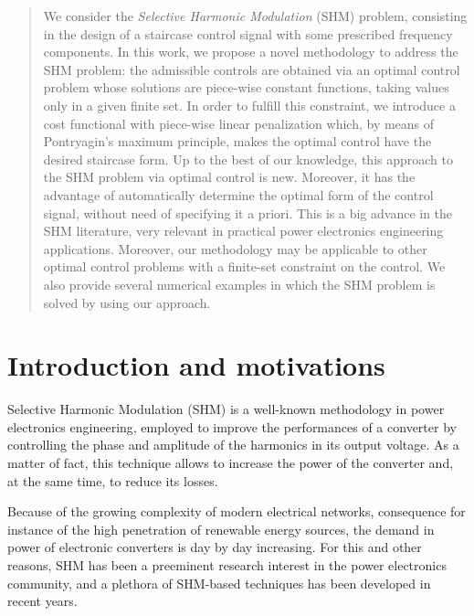 \documentclass[twocolumn]{autart}    %
\begin{document}
\begin{frontmatter}
\begin{abstract}%
We consider the \emph{Selective Harmonic Modulation} (SHM) problem, consisting in the design of a staircase control signal with some prescribed frequency components. In this work, we propose a novel methodology to  address the SHM problem: the admissible controls are obtained via an optimal control problem whose solutions are piece-wise constant functions, taking values only in a given finite set. In order to fulfill this constraint, we introduce a cost functional with piece-wise linear penalization which, by means of Pontryagin's maximum principle, makes the optimal control have the desired staircase form. Up to the best of our knowledge, this approach to the SHM problem via optimal control is new. Moreover, it has the  advantage of automatically determine the optimal form of the control signal, without need of specifying it a priori. This is a big advance in the SHM literature, very relevant in practical power electronics engineering applications. Moreover, our methodology may be applicable to other optimal control problems with a finite-set constraint on the control. We also provide several numerical examples in which the SHM problem is solved by using our approach.
\end{abstract}

\end{frontmatter}

\section{Introduction and motivations}\label{Section1}

Selective Harmonic Modulation (SHM) \cite{Sun1992,Sun1996} is a well-known methodology in power electronics engineering, employed to improve the performances of a converter by controlling the phase and amplitude of the harmonics in its output voltage. As a matter of fact, this technique allows to increase the power of the converter and, at the same time, to reduce its losses. 

Because of the growing complexity of modern electrical networks, consequence for instance of the high penetration of renewable energy sources, the demand in power of electronic converters is day by day increasing. For this and other reasons, SHM has been a preeminent research interest in the power electronics community, and a plethora of SHM-based techniques has been developed in recent years. 
\end{document}
